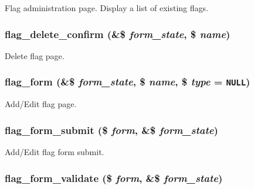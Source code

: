Flag administration page. Display a list of existing flags. \hypertarget{flag_8admin_8inc_d8dc93ec56970ea7459c83e2462eb264}{
\subsubsection[{flag\_\-delete\_\-confirm}]{\setlength{\rightskip}{0pt plus 5cm}flag\_\-delete\_\-confirm (\&\$ {\em form\_\-state}, \/  \$ {\em name})}}
\label{flag_8admin_8inc_d8dc93ec56970ea7459c83e2462eb264}


Delete flag page. \hypertarget{flag_8admin_8inc_924a401068a0ae9c660ff187e1c84e51}{
\subsubsection[{flag\_\-form}]{\setlength{\rightskip}{0pt plus 5cm}flag\_\-form (\&\$ {\em form\_\-state}, \/  \$ {\em name}, \/  \$ {\em type} = {\tt NULL})}}
\label{flag_8admin_8inc_924a401068a0ae9c660ff187e1c84e51}


Add/Edit flag page. \hypertarget{flag_8admin_8inc_9f457d3b15f5bc2948a11dafe129efcb}{
\subsubsection[{flag\_\-form\_\-submit}]{\setlength{\rightskip}{0pt plus 5cm}flag\_\-form\_\-submit (\$ {\em form}, \/  \&\$ {\em form\_\-state})}}
\label{flag_8admin_8inc_9f457d3b15f5bc2948a11dafe129efcb}


Add/Edit flag form submit. \hypertarget{flag_8admin_8inc_4fb77a5a0f2ab53f8823b3a0d79dc4bd}{
\subsubsection[{flag\_\-form\_\-validate}]{\setlength{\rightskip}{0pt plus 5cm}flag\_\-form\_\-validate (\$ {\em form}, \/  \&\$ {\em form\_\-state})}}
\label{flag_8admin_8inc_4fb77a5a0f2ab53f8823b3a0d79dc4bd}


